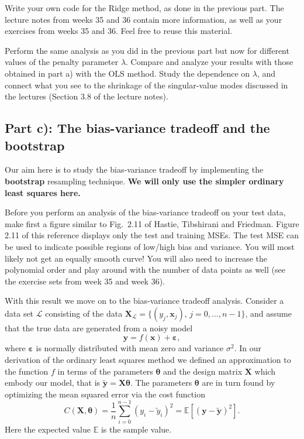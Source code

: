 \documentclass[11pt,a4paper]{article}
\begin{document}
Write your own code for the Ridge method, as done in the previous part.  The
lecture notes from weeks 35 and 36 contain more information, as well as your exercises from weeks 35 and 36. Feel free to reuse this material.

Perform the same analysis as you did in the previous part but now for
different values of the penalty parameter $\lambda$.  Compare and analyze
your results with those obtained in part a) with the OLS method.  Study the
dependence on $\lambda$, and connect what you see to the shrinkage of the
singular-value modes discussed in the lectures (Section 3.8 of the lecture
notes).

\subsection*{Part c): The bias-variance tradeoff and the bootstrap}

Our aim here is to study the bias-variance tradeoff by implementing the
\textbf{bootstrap} resampling technique.  \textbf{We will only use the
simpler ordinary least squares here.}

Before you perform an analysis of the bias-variance tradeoff on your test
data, make first a figure similar to Fig.~2.11 of Hastie, Tibshirani and
Friedman.  Figure 2.11 of this reference displays only the test and training
MSEs.  The test MSE can be used to indicate possible regions of low/high bias
and variance.  You will most likely not get an equally smooth curve!  You will
also need to increase the polynomial order and play around with the number of
data points as well (see the exercise sets from week 35 and week 36).

With this result we move on to the bias-variance tradeoff analysis.
Consider a data set $\mathcal{L}$ consisting of the data
$\bm{X}_\mathcal{L}=\{(y_j,\bm{x}_j),\,j=0,\dots,n-1\}$, and assume that the
true data are generated from a noisy model
\[
  \bm{y} = f(\bm{x}) + \bm{\varepsilon},
\]
where $\bm{\varepsilon}$ is normally distributed with mean zero and variance
$\sigma^2$.  In our derivation of the ordinary least squares method we
defined an approximation to the function $f$ in terms of the parameters
$\bm{\theta}$ and the design matrix $\bm{X}$ which embody our model, that is
$\tilde{\bm{y}}=\bm{X}\bm{\theta}$.  The parameters $\bm{\theta}$ are in turn
found by optimizing the mean squared error via the cost function
\[
  C(\bm{X},\bm{\theta}) = \frac{1}{n}\sum_{i=0}^{n-1}(y_i-\tilde{y}_i)^2
   = \mathbb{E}\left[(\bm{y}-\tilde{\bm{y}})^2\right].
\]
Here the expected value $\mathbb{E}$ is the sample value.
\end{document}
